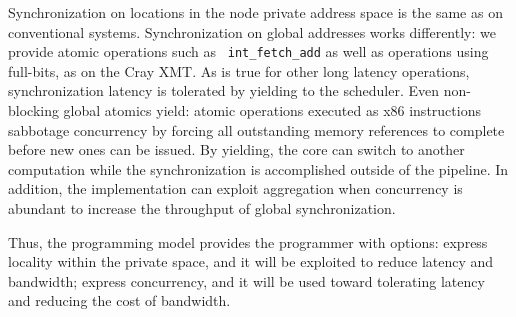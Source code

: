 \documentclass{acm_proc_article-sp}
\begin{document}
Synchronization on locations in the node private address space is the
same as on conventional systems.  Synchronization on global addresses
works differently: we provide atomic operations such as {\tt
  int\_fetch\_add} as well as operations using full-bits, as on the
Cray XMT.  As is true for other long latency operations,
synchronization latency is tolerated by yielding to the scheduler.
Even non-blocking global atomics yield: atomic operations executed as
x86 instructions sabbotage concurrency by forcing all outstanding
memory references to complete before new ones can be issued.  By
yielding, the core can switch to another computation while the
synchronization is accomplished outside of the pipeline.  In addition,
the implementation can exploit aggregation when concurrency is
abundant to increase the throughput of global synchronization.

Thus, the programming model provides the programmer with options: express
locality within the private space, and it will be exploited to reduce
latency and bandwidth; express concurrency, and it will be used toward
tolerating latency and reducing the cost of bandwidth.
\end{document}
